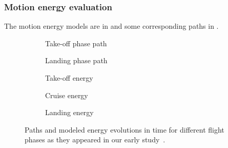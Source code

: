 \subsubsection*{Motion energy evaluation}

The motion energy models are in  and some corresponding paths in .
\begin{figure}[h!]
  \centering
  \selectfont
  \footnotesize
  \begin{subfigure}[c]{0.475\textwidth}
    \centering
    
    \caption{Take-off phase path}
    \label{fig:takeoff-path}
    \vspace{1.4ex}
  \end{subfigure}
  \begin{subfigure}[c]{0.475\textwidth}
    \centering
    
    \vspace*{3ex}
    \caption{Landing phase path}
    \label{fig:landing-path}
    \vspace{1.4ex}
  \end{subfigure}
  \quad
  \begin{subfigure}[t]{0.35\textwidth}
    \centering
    
    \caption{Take-off energy}
    \label{fig:takeoff-energy}
  \end{subfigure}
  \begin{subfigure}[t]{0.31\textwidth}
    \centering
    
    \caption{Cruise energy}
    \label{fig:cruise-energy}
  \end{subfigure}
  \begin{subfigure}[t]{0.30\textwidth}
    \centering
    
    \caption{Landing energy}
    \label{fig:landing-energy}
  \end{subfigure}
  \sfr
  \caption[Paths and modeled energy evolutions in time for different flight phases]{Paths and modeled energy evolutions in time for different flight phases as they appeared in our early study~\citep{seewald2020mechanical}.}
  \label{fig:path-energy}
  \efr
\end{figure}
